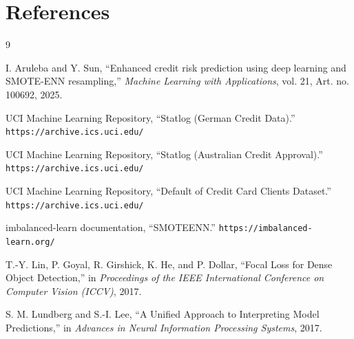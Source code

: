 \documentclass[11pt,a4paper]{article}
\begin{document}
\section{References}
\begin{thebibliography}{9}

I. Aruleba and Y. Sun,
``Enhanced credit risk prediction using deep learning and SMOTE-ENN resampling,''
\emph{Machine Learning with Applications},
vol. 21, Art. no. 100692, 2025.

UCI Machine Learning Repository,
``Statlog (German Credit Data).''
\texttt{https://archive.ics.uci.edu/}

UCI Machine Learning Repository,
``Statlog (Australian Credit Approval).''
\texttt{https://archive.ics.uci.edu/}

UCI Machine Learning Repository,
``Default of Credit Card Clients Dataset.''
\texttt{https://archive.ics.uci.edu/}

imbalanced-learn documentation,
``SMOTEENN.''
\texttt{https://imbalanced-learn.org/}

T.-Y. Lin, P. Goyal, R. Girshick, K. He, and P. Dollar,
``Focal Loss for Dense Object Detection,''
in \emph{Proceedings of the IEEE International Conference on Computer Vision (ICCV)}, 2017.

S. M. Lundberg and S.-I. Lee,
``A Unified Approach to Interpreting Model Predictions,''
in \emph{Advances in Neural Information Processing Systems}, 2017.

\end{thebibliography}
\end{document}
